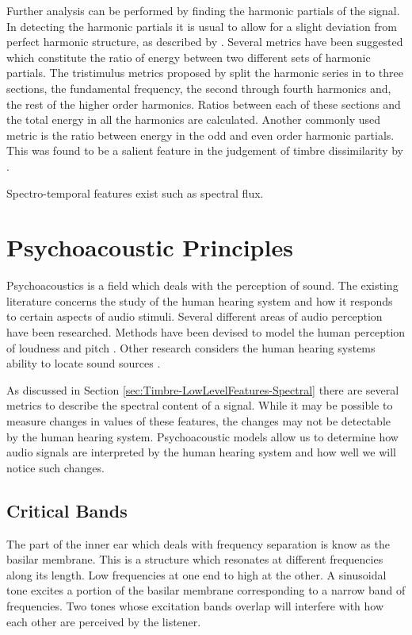 		Further analysis can be performed by finding the harmonic partials of the signal. In detecting the harmonic
		partials it is usual to allow for a slight deviation from perfect harmonic structure, as described by
		\citet{peeters2011the}. Several metrics have been suggested which constitute the ratio of energy between two
		different sets of harmonic partials. The tristimulus metrics proposed by \citet{pollard1982a} split the
		harmonic series in to three sections, the fundamental frequency, the second through fourth harmonics and,
		the rest of the higher order harmonics. Ratios between each of these sections and the total energy in all
		the harmonics are calculated. Another commonly used metric is the ratio between energy in the odd and even
		order harmonic partials. This was found to be a salient feature in the judgement of timbre dissimilarity by
		\citet{hall2010importance}. 

		\note
		{
			Spectro-temporal features exist such as spectral flux.
		}

\section{Psychoacoustic Principles}
\label{sec:Timbre-PsychoacousticPrinciples}
	Psychoacoustics is a field which deals with the perception of sound. The existing literature concerns the study of
	the human hearing system and how it responds to certain aspects of audio stimuli. Several different areas of audio
	perception have been researched. Methods have been devised to model the human perception of loudness
	\citep{moore1997a} and pitch \citep{gerhard2003pitch}. Other research considers the human hearing systems ability to
	locate sound sources \citep{blauert1997spatial}. 

	As discussed in Section \ref{sec:Timbre-LowLevelFeatures-Spectral} there are several metrics to describe the
	spectral content of a signal. While it may be possible to measure changes in values of these features, the changes
	may not be detectable by the human hearing system. Psychoacoustic models allow us to determine how audio signals are
	interpreted by the human hearing system and how well we will notice such changes.

	\subsection{Critical Bands}
	\label{sec:Timbre-PsychoacousticPrinciples-CriticalBands}
		The part of the inner ear which deals with frequency separation is know as the basilar membrane. This is a
		structure which resonates at different frequencies along its length. Low frequencies at one end to high at
		the other. A sinusoidal tone excites a portion of the basilar membrane corresponding to a narrow band of
		frequencies. Two tones whose excitation bands overlap will interfere with how each other are perceived by
		the listener.

